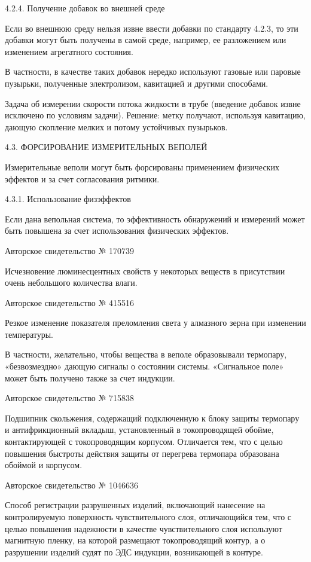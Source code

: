 4.2.4. Получение добавок во внешней среде

Если во внешнюю среду нельзя  извне ввести добавки по стандарту 4.2.3,
то  эти  добавки могут  быть  получены  в  самой среде,  например,  ее
разложением или изменением агрегатного состояния.

В  частности,  в качестве  таких  добавок  нередко используют  газовые
или паровые  пузырьки, полученные  электролизом, кавитацией  и другими
способами.

Задача  об  измерении  скорости  потока  жидкости  в  трубе  (введение
добавок извне исключено по  условиям задачи). Решение: метку получают,
используя  кавитацию,  дающую  скопление мелких  и  потому  устойчивых
пузырьков.


4.3. ФОРСИРОВАНИЕ ИЗМЕРИТЕЛЬНЫХ ВЕПОЛЕЙ

Измерительные  веполи могут  быть  форсированы применением  физических
эффектов и за счет согласования ритмики.


4.3.1. Использование физэффектов

Если дана вепольная система,  то эффективность обнаружений и измерений
может быть повышена за счет использования физических эффектов.


Авторское свидетельство № 170739

Исчезновение люминесцентных свойств у  некоторых веществ в присутствии
очень небольшого количества влаги.


Авторское свидетельство № 415516

Резкое изменение  показателя преломления  света у алмазного  зерна при
изменении температуры.

В  частности,   желательно,  чтобы  вещества  в   веполе  образовывали
термопару,   «безвозмездно»  дающую   сигналы  о   состоянии  системы.
«Сигнальное поле» может быть получено также за счет индукции.


Авторское свидетельство № 715838

Подшипник скольжения, содержащий подключенную к блоку защиты термопару
и  антифрикционный  вкладыш,  установленный в  токопроводящей  обойме,
контактирующей с токопроводящим корпусом.  Отличается тем, что с целью
повышения быстроты  действия защиты от перегрева  термопара образована
обоймой и корпусом.


Авторское свидетельство № 1046636

Способ  регистрации  разрушенных   изделий,  включающий  нанесение  на
контролируемую  поверхность  чувствительного слоя,  отличающийся  тем,
что  с  целью повышения  надежности  в  качестве чувствительного  слоя
используют  магнитную  пленку,  на  которой  размещают  токопроводящий
контур, а  о разрушении изделий  судят по ЭДС индукции,  возникающей в
контуре.


